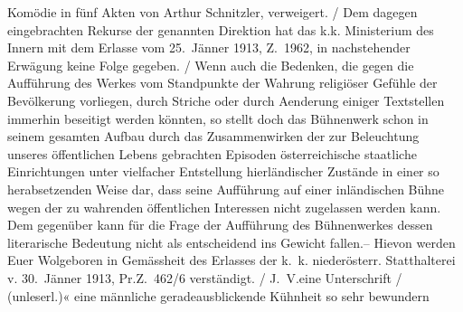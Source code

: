 {{{                        Komödie in fünf Akten von Arthur Schnitzler, verweigert.{ / }Dem dagegen eingebrachten Rekurse der genannten Direktion hat das k.k. Ministerium des Innern mit dem Erlasse vom
                           25. Jänner 1913, Z. 1962, in nachstehender Erwägung keine
                        Folge gegeben.{ / }Wenn auch die Bedenken, die gegen die Aufführung
                        des Werkes vom
                        Standpunkte der Wahrung religiöser Gefühle der Bevölkerung vorliegen, durch
                        Striche oder durch Aenderung einiger Textstellen immerhin beseitigt werden
                        könnten, so stellt doch das Bühnenwerk schon in seinem gesamten Aufbau durch
                        das Zusammenwirken der zur Beleuchtung unseres öffentlichen Lebens
                        gebrachten Episoden österreichische
                        staatliche Einrichtungen unter vielfacher Entstellung hierländischer
                        Zustände in einer so herabsetzenden Weise dar, dass seine Aufführung auf
                        einer inländischen Bühne wegen der zu wahrenden öffentlichen Interessen
                        nicht zugelassen werden kann. Dem gegenüber kann für die Frage der
                        Aufführung des Bühnenwerkes dessen
                        literarische Bedeutung nicht als entscheidend ins Gewicht fallen.– Hievon
                        werden Euer Wolgeboren in Gemässheit des Erlasses der k. k. niederösterr. Statthalterei v.
                           30. Jänner 1913, Pr.Z. 462/6 verständigt.{ / }J. V.eine Unterschrift{ / }(unleserl.)«}}}\label{K_L03641-1} eine männliche geradeausblickende Kühnheit so sehr bewundern
